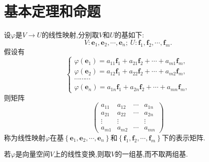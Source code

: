 \documentclass[../../main.tex]{subfiles}%
\begin{document}
\section{基本定理和命题}

\begin{definition}[线性映射的表示矩阵]\label{definition:线性映射的表示矩阵}
设\(\varphi\)是\(V\to U\)的线性映射,分别取\(V\)和\(U\)的基如下:
\[
V:\boldsymbol{e}_1,\boldsymbol{e}_2,\cdots,\boldsymbol{e}_n; \ U:\boldsymbol{f}_1,\boldsymbol{f}_2,\cdots,\boldsymbol{f}_m.
\]
假设有
\[
\begin{cases}
\varphi(\boldsymbol{e}_1)=a_{11}\boldsymbol{f}_1 + a_{21}\boldsymbol{f}_2+\cdots + a_{m1}\boldsymbol{f}_m,\\
\varphi(\boldsymbol{e}_2)=a_{12}\boldsymbol{f}_1 + a_{22}\boldsymbol{f}_2+\cdots + a_{m2}\boldsymbol{f}_m,\\
\cdots\cdots\cdots\\
\varphi(\boldsymbol{e}_n)=a_{1n}\boldsymbol{f}_1 + a_{2n}\boldsymbol{f}_2+\cdots + a_{mn}\boldsymbol{f}_m,
\end{cases}
\]
则矩阵
\[
\begin{pmatrix}
a_{11}&a_{12}&\cdots&a_{1n}\\
a_{21}&a_{22}&\cdots&a_{2n}\\
\vdots&\vdots&&\vdots\\
a_{m1}&a_{m2}&\cdots&a_{mn}
\end{pmatrix}
\]
称为线性映射\(\varphi\)在基$\left\{ \boldsymbol{e}_1,\boldsymbol{e}_2,\cdots ,\boldsymbol{e}_n \right\}$和$\left\{ \boldsymbol{f}_1,\boldsymbol{f}_2,\cdots ,\boldsymbol{f}_m \right\}$下的表示矩阵.
\end{definition}
\begin{remark}
若\(\varphi\)是向量空间\(V\)上的线性变换,则取\(V\)的一组基,而不取两组基.
\end{remark}
\end{document}
